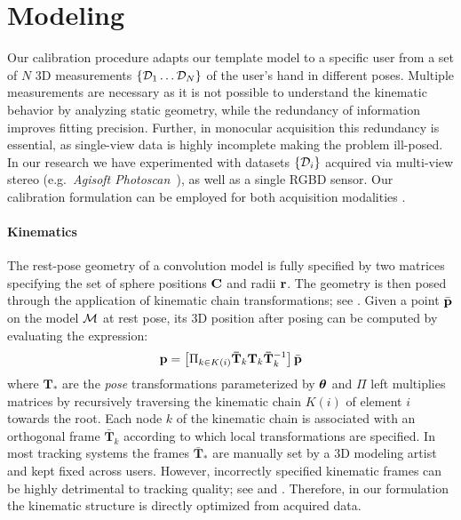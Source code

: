 \section{Modeling}
\label{sec:modeling}

Our calibration procedure adapts our template model to a specific user from a set of $N$ 3D measurements $\{ \mathcal{D}_1 \dots \mathcal{D}_N \}$ of the user's hand in different poses. Multiple measurements are necessary as it is not possible to understand the kinematic behavior by analyzing static geometry, while the redundancy of information improves fitting precision. Further, in  monocular acquisition this redundancy is essential, as single-view data is highly incomplete making the problem ill-posed. In our research we have experimented with datasets $\{\mathcal{D}_i\}$ acquired via  multi-view stereo (e.g.\ \emph{Agisoft Photoscan~\textcopyright}), as well as a single RGBD sensor. Our calibration formulation can be employed for both acquisition modalities .


\paragraph{Kinematics}
The rest-pose geometry of a convolution model is fully specified by two matrices specifying the set of sphere positions ${\mathbf{C}}$ and radii ${\mathbf{r}}$. The geometry is then posed through the application of  kinematic chain transformations; see . Given a point $\bar{\mathbf{p}}$ on the model $\mathcal{M}$ at rest pose, its 3D position after posing can be computed by evaluating the expression:
% 
\begin{equation}
\mathbf{p} = \left[ \Pi_{k \in K(i)} \mathbf{\bar{T}}_k \mathbf{T}_k \mathbf{\bar{T}}_k^{-1} \right] \bar{\mathbf{p}}
\label{eq:kinematic}
\end{equation}
%
where $\mathbf{T}_*$ are the \emph{pose} transformations parameterized by $\boldsymbol{\theta}$ and $\Pi$ left multiplies matrices by recursively traversing the kinematic chain $K(i)$ of element $i$ towards the root. Each node $k$ of the kinematic chain is associated with an orthogonal frame $\mathbf{\bar{T}}_k$ according to which local transformations are specified. In most tracking systems the frames $\mathbf{\bar{T}}_*$ are manually set by a 3D modeling artist and kept fixed across users. However, incorrectly specified kinematic frames can be highly detrimental to tracking quality; see  and . Therefore, in our formulation the kinematic structure is directly optimized from acquired data.

